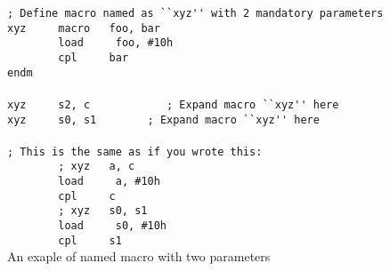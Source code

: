         \begin{code}[h!]
            \mysmallfont{}
            {\color{highlight_comment}\verb'; Define macro named as ``xyz'\verb"'"\verb''\verb"'"\verb' with 2 mandatory parameters'}\\
            {\color{highlight_macro}\verb'xyz'}\verb'     '{\color{highlight_directive}\verb'macro'}\verb'   '{\color{highlight_constant}\verb'foo'}{\color{highlight_oper_sep}\verb','}\verb' '{\color{highlight_constant}\verb'bar'}\\
            \verb'        '{\color{highlight_instruction}\verb'load'}\verb'     '{\color{highlight_constant}\verb'foo'}{\color{highlight_oper_sep}\verb','}\verb' '{\color{highlight_imm_hex}\verb'#10h'}\\
            \verb'        '{\color{highlight_instruction}\verb'cpl'}\verb'     '{\color{highlight_constant}\verb'bar'}\\
            {\color{highlight_directive}\verb'endm'}\\
            \verb''\\
            {\color{highlight_macro}\verb'xyz'}\verb'     '{\color{highlight_sfr}\verb's2'}{\color{highlight_oper_sep}\verb','}\verb' '{\color{highlight_sfr}\verb'c'}\verb'            '{\color{highlight_comment}\verb'; Expand macro ``xyz'\verb"'"\verb''\verb"'"\verb' here'}\\
            {\color{highlight_macro}\verb'xyz'}\verb'     '{\color{highlight_sfr}\verb's0'}{\color{highlight_oper_sep}\verb','}\verb' '{\color{highlight_sfr}\verb's1'}\verb'        '{\color{highlight_comment}\verb'; Expand macro ``xyz'\verb"'"\verb''\verb"'"\verb' here'}\\
            \verb''\\
            {\color{highlight_comment}\verb'; This is the same as if you wrote this:'\\
            }\verb'        '{\color{highlight_comment}\verb'; xyz   a, c'\\
            }\verb'        '{\color{highlight_instruction}\verb'load'}\verb'     '{\color{highlight_sfr}\verb'a'}{\color{highlight_oper_sep}\verb','}\verb' '{\color{highlight_imm_hex}\verb'#10h'}\\
            \verb'        '{\color{highlight_instruction}\verb'cpl'}\verb'     '{\color{highlight_sfr}\verb'c'}\\
            \verb'        '{\color{highlight_comment}\verb'; xyz   s0, s1'}\\
            \verb'        '{\color{highlight_instruction}\verb'load'}\verb'     '{\color{highlight_sfr}\verb's0'}{\color{highlight_oper_sep}\verb','}\verb' '{\color{highlight_imm_hex}\verb'#10h'}\\
            \verb'        '{\color{highlight_instruction}\verb'cpl'}\verb'     '{\color{highlight_sfr}\verb's1'}\\
            \caption{An exaple of named macro with two parameters}
        \end{code}
